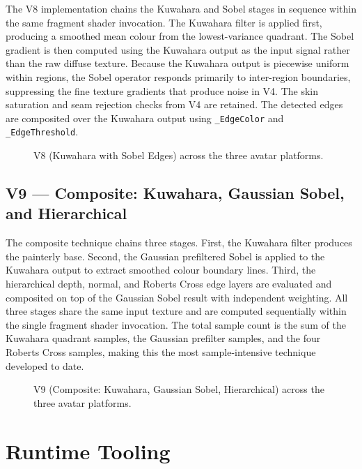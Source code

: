 The V8 implementation chains the Kuwahara and Sobel stages in sequence within the same fragment shader invocation. The Kuwahara filter is applied first, producing a smoothed mean colour from the lowest-variance quadrant. The Sobel gradient is then computed using the Kuwahara output as the input signal rather than the raw diffuse texture. Because the Kuwahara output is piecewise uniform within regions, the Sobel operator responds primarily to inter-region boundaries, suppressing the fine texture gradients that produce noise in V4. The skin saturation and seam rejection checks from V4 are retained. The detected edges are composited over the Kuwahara output using \texttt{\_EdgeColor} and \texttt{\_EdgeThreshold}.

\begin{figure}[H]
  \centering
  \caption{V8 (Kuwahara with Sobel Edges) across the three avatar platforms.}
  \label{fig:v8_impl}
\end{figure}

\subsection{V9 — Composite: Kuwahara, Gaussian Sobel, and Hierarchical}
\label{sec:impl_v9}

The composite technique chains three stages. First, the Kuwahara filter produces the painterly base. Second, the Gaussian prefiltered Sobel is applied to the Kuwahara output to extract smoothed colour boundary lines. Third, the hierarchical depth, normal, and Roberts Cross edge layers are evaluated and composited on top of the Gaussian Sobel result with independent weighting. All three stages share the same input texture and are computed sequentially within the single fragment shader invocation. The total sample count is the sum of the Kuwahara quadrant samples, the Gaussian prefilter samples, and the four Roberts Cross samples, making this the most sample-intensive technique developed to date.

\begin{figure}[H]
  \centering
  \caption{V9 (Composite: Kuwahara, Gaussian Sobel, Hierarchical) across the three avatar platforms.}
  \label{fig:v9_impl}
\end{figure}

\section{Runtime Tooling}
\label{sec:impl_tooling}

